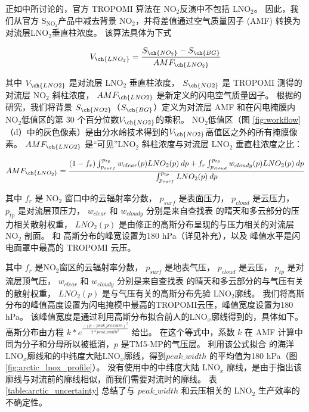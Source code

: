正如\citet{Zhang.2022a}中所讨论的，官方 TROPOMI 算法在 NO$_2$反演中不包括 LNO$_2$。
因此，我们从官方 S$_{\textrm{NO$_2$}}$产品中减去背景 NO$_2$，并将差值通过空气质量因子 (AMF) 转换为对流层LNO$_2$垂直柱浓度。
该算法具体为下式


\begin{equation} \label{eq:arctic_LNO2}
V_{\ch{LNO_2}} = \frac{S_{\ch{NO_2}} - S_{\ch{BG}}}{AMF_{\ch{LNO_2}}}
\end{equation}


其中 $V_{\ch{LNO2}}$ 是对流层 LNO$_2$ 垂直柱浓度，
$S_{\ch{NO2}}$ 是 TROPOMI 测得的对流层 NO$_2$ 斜柱浓度，
$AMF_{\ch{LNO2}}$ 是新定义的闪电空气质量因子。
根据\citet{Allen.2021a}的研究，我们将背景 $S_{\ch{NO2}}$（$S_{\ch{BG}}$）定义为对流层 AMF 和在闪电掩膜内NO$_2$低值区的第 30 个百分位数$V_{\ch{NO2}}$的乘积。
NO$_2$低值区（图 \ref{fig:workflow}（d）中的灰色像素）是由分水岭技术得到的$V_{\ch{NO2}}$高值区之外的所有掩膜像素。
$AMF_{\ch{LNO2}}$ 是“可见”LNO$_2$ 斜柱浓度与对流层 LNO$_2$ 垂直柱浓度之比：

\begin{equation} \label{eq:arctic_AMFLNO2}
AMF_{\ch{LNO_2}} = \frac{(1-f_r) \int_{p_{surf}}^{p_{tp}} w_{clear}(p) LNO_2(p) \: dp + f_r \int_{p_{cloud}}^{p_{tp}} w_{cloudy}(p) LNO_2(p) \: dp}{\int_{p_{surf}}^{p_{tp}} LNO_2(p) \: dp}
\end{equation}

其中 $f_{r}$ 是 NO$_2$ 窗口中的云辐射率分数，
$p_{surf}$ 是表面压力，
$p_{cloud}$ 是云压力，
$p_{tp}$ 是对流层顶压力，
$w_{clear}$ 和 $w_{cloudy}$ 分别是来自查找表 \cite{Lorente.2017} 的晴天和多云部分的压力相关散射权重，
$LNO_2(p)$ 是由修正的高斯分布呈现的与压力相关的对流层 NO$_2$ 剖面。
\citeauthor{Ott.2010} \cite{Ott.2010} 和 \citeauthor{Luo.2017} \cite{Luo.2017} 高斯分布的峰宽设置为180 hPa（详见补充），以及 峰值水平是闪电面罩中最高的 TROPOMI 云压。

其中 $f_{r}$ 是NO$_2$窗区的云辐射率分数，
$p_{surf}$ 是地表气压，
$p_{cloud}$ 是云压，
$p_{tp}$ 是对流层顶气压，
$w_{clear}$ 和 $w_{cloudy}$ 分别是来自查找表 \citep{Lorente.2017}的晴天和多云部分的与气压有关的散射权重，
$LNO_2(p)$ 是与气压有关的高斯分布先验 LNO$_2$廓线。
我们将高斯分布的峰值高度设置为闪电掩模中最高的TROPOMI云压，峰值宽度设置为180 hPa。
该峰值宽度是通过利用高斯分布拟合前人的LNO$_x$廓线得到的，具体如下。
高斯分布由方程 $k*e^\frac{{-{(p - peak\_pressure)}^2}}{2*peak\_width^{2}}$ 给出。
在这个等式中，系数 $k$ 在 AMF 计算中同为分子和分母所以被抵消，$p$ 是TM5-MP的气压层。
利用该公式拟合 \citet{Ott.2010} 的海洋LNO$_x$廓线和\citet{Luo.2017}的中纬度大陆LNO$_x$廓线，得到$peak\_width$ 的平均值为180 hPa（图\ref{fig:arctic_lnox_profile}）。
没有使用\citet{Ott.2010}中的中纬度大陆 LNO$_x$ 廓线，是由于\citet{Luo.2017}指出该廓线与对流前的廓线相似，而我们需要对流时的廓线。
表 \ref{table:arctic_uncertainty} 总结了与 $peak\_width$ 和云压相关的 LNO$_2$ 生产效率的不确定性。

